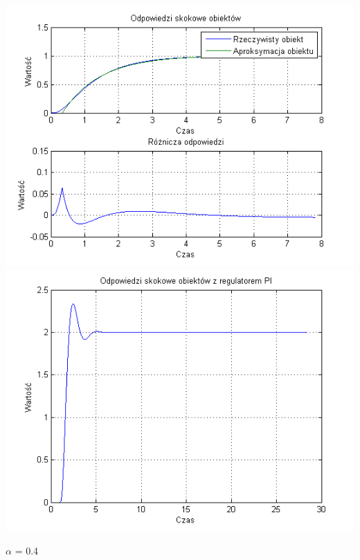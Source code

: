 \documentclass[10pt,a4paper]{article}
\begin{document}
\begin{center}
\includegraphics[scale=1]{images/jeden/skrypt_121.png}\\
\includegraphics[scale=1]{images/jeden/skrypt_122.png}\\
\end{center}
\newpage
$\alpha$ = 0.4
\end{document}
